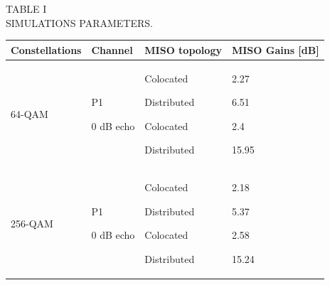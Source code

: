 \documentclass[10pt, conference]{IEEEtran}
\begin{document}
\begin{table}[!htbp]
\centering
\begin{center}
{\small TABLE I\\
SIMULATIONS PARAMETERS.}
\end{center}
\begin{tabular}{|p{1.7cm}|p{1.45cm}|p{1.96cm}|p{2.05cm}|}
\hline \footnotesize
Constellations & \footnotesize Channel & \footnotesize MISO topology & \footnotesize MISO Gains [dB] \\
\hline
64-QAM & P1 \par 0 dB echo & Colocated \par Distributed \par Colocated \par Distributed & 2.27 \par 6.51 \par 2.4 \par 15.95 \\
\hline
256-QAM & P1 \par 0 dB echo & Colocated \par Distributed \par Colocated \par Distributed & 2.18 \par 5.37 \par 2.58 \par 15.24 \\
\hline
\end{tabular}
\end{table}
\end{document}

